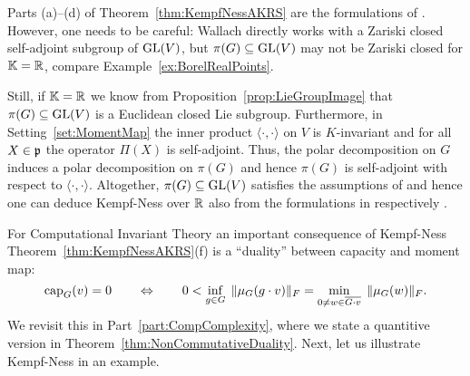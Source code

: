 \begin{remark} \label{rem:KempfNessFurtherLiterature}
	Parts (a)--(d) of Theorem~\ref{thm:KempfNessAKRS} are the formulations of \cite[Theorems~3.26 and 3.28]{Wallach}. However, one needs to be careful: Wallach directly works with a Zariski closed self-adjoint subgroup of $\operatorname{GL}(V)$, but $\pi(G) \subseteq \operatorname{GL}(V)$ may not be Zariski closed for $\mathbb K = \mathbb R$, compare Example~\ref{ex:BorelRealPoints}.
	
	Still, if $\mathbb K = \mathbb R$ we know from Proposition~\ref{prop:LieGroupImage} that $\pi(G) \subseteq \operatorname{GL}(V)$ is a Euclidean closed Lie subgroup. Furthermore, in Setting~\ref{set:MomentMap} the inner product $\langle \cdot, \cdot \rangle$ on $V$ is $K$-invariant and for all $X \in \mathfrak{p}$ the operator $\Pi(X)$ is self-adjoint. Thus, the polar decomposition on $G$ induces a polar decomposition on $\pi(G)$ and hence $\pi(G)$ is self-adjoint with respect to $\langle \cdot, \cdot \rangle$. Altogether, $\pi(G) \subseteq \operatorname{GL}(V)$ satisfies the assumptions of \cite{biliotti2021RealKempfNess, RealGIT} and hence one can deduce Kempf-Ness over $\mathbb R$ also from the formulations in \cite[Theorem~1.1]{RealGIT} respectively \cite[Theorem~1]{biliotti2021RealKempfNess}.
	\hfill\remSymbol
\end{remark}

For Computational Invariant Theory an important consequence of Kempf-Ness Theorem~\ref{thm:KempfNessAKRS}(f) is a ``duality'' between capacity and moment map:
\begin{equation}\label{eq:KempfNessDuality}
	\operatorname{cap}_G(v) = 0 \qquad \Leftrightarrow \qquad 
	0 < \inf_{g \in G} \; \| \mu_G(g \cdot v) \|_F = \min_{0 \neq w \in \overline{G \cdot v}} \; \| \mu_G(w) \|_F .
\end{equation}
We revisit this in Part~\ref{part:CompComplexity}, where we state a quantitive version in Theorem~\ref{thm:NonCommutativeDuality}.
Next, let us illustrate Kempf-Ness in an example.


